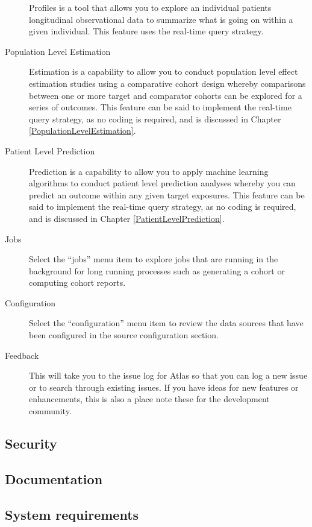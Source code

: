 \documentclass[11pt]{book}
\theoremstyle{definition}
\theoremstyle{definition}
\theoremstyle{definition}
\theoremstyle{remark}
\begin{document}
\begin{description}
Profiles is a tool that allows you to explore an individual patients longitudinal observational data to summarize what is going on within a given individual. This feature uses the real-time query strategy.
\item[Population Level Estimation]
Estimation is a capability to allow you to conduct population level effect estimation studies using a comparative cohort design whereby comparisons between one or more target and comparator cohorts can be explored for a series of outcomes. This feature can be said to implement the real-time query strategy, as no coding is required, and is discussed in Chapter \ref{PopulationLevelEstimation}.
\item[Patient Level Prediction]
Prediction is a capability to allow you to apply machine learning algorithms to conduct patient level prediction analyses whereby you can predict an outcome within any given target exposures. This feature can be said to implement the real-time query strategy, as no coding is required, and is discussed in Chapter \ref{PatientLevelPrediction}.
\item[Jobs]
Select the ``jobs'' menu item to explore jobs that are running in the background for long running processes such as generating a cohort or computing cohort reports.
\item[Configuration]
Select the ``configuration'' menu item to review the data sources that have been configured in the source configuration section.
\item[Feedback]
This will take you to the issue log for Atlas so that you can log a new issue or to search through existing issues. If you have ideas for new features or enhancements, this is also a place note these for the development community.
\end{description}

\hypertarget{security}{%
\subsection{Security}\label{security}}

\hypertarget{documentation}{%
\subsection{Documentation}\label{documentation}}

\hypertarget{system-requirements}{%
\subsection{System requirements}\label{system-requirements}}
\end{document}

